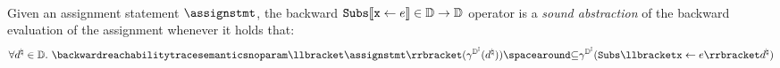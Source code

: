 \begin{description}
{\begin{align*}
  \end{align*}
}
\begin{definition}
  Given an assignment statement $\assignstmt$, the backward $\textup{\texttt{Subs}}\llbracket \textup{\texttt{x}}\leftarrow e \rrbracket \in \mathbb{D} \to \mathbb{D}$ operator is a \emph{sound abstraction} of the backward evaluation of the assignment whenever it holds that:
\begin{align*}
  \forall \defabstractvalue\in\abstractdomain.\spacer \backwardreachabilitytracesemanticsnoparam\semanticsof{\assignstmt}( \intervalabstractdomainconcretization(\defabstractvalue)) \SubseteQ \intervalabstractdomainconcretization(\abstractdomainsubstitute{\defvariable}{\defaexp} \defabstractvalue)
\end{align*}
\end{definition}


\end{description}
